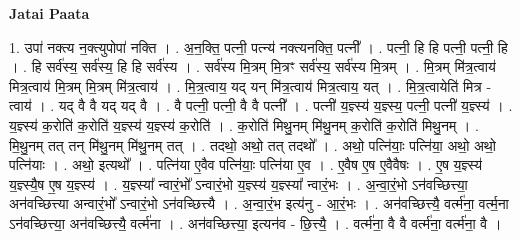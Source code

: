 \documentclass[17pt]{extarticle}
\begin{document}
\textbf{Jatai Paata} \newline

1. उपा॑ नक्त्य न॒क्त्युपोपा॑ नक्ति । . अ॒न॒क्ति॒ पत्नी॒ पत्न्य॑ नक्त्यनक्ति॒ पत्नी᳚ । . पत्नी॒ हि हि पत्नी॒ पत्नी॒ हि । . हि सर्व॑स्य॒ सर्व॑स्य॒ हि हि सर्व॑स्य । . सर्व॑स्य मि॒त्रम् मि॒त्रꣳ सर्व॑स्य॒ सर्व॑स्य मि॒त्रम् । . मि॒त्रम् मि॑त्र॒त्वाय॑ मित्र॒त्वाय॑ मि॒त्रम् मि॒त्रम् मि॑त्र॒त्वाय॑ । . मि॒त्र॒त्वाय॒ यद् यन् मि॑त्र॒त्वाय॑ मित्र॒त्वाय॒ यत् । . मि॒त्र॒त्वायेति॑ मित्र - त्वाय॑ । . यद् वै वै यद् यद् वै । . वै पत्नी॒ पत्नी॒ वै वै पत्नी᳚ । . पत्नी॑ य॒ज्ञ्स्य॑ य॒ज्ञ्स्य॒ पत्नी॒ पत्नी॑ य॒ज्ञ्स्य॑ । . य॒ज्ञ्स्य॑ क॒रोति॑ क॒रोति॑ य॒ज्ञ्स्य॑ य॒ज्ञ्स्य॑ क॒रोति॑ । . क॒रोति॑ मिथु॒नम् मि॑थु॒नम् क॒रोति॑ क॒रोति॑ मिथु॒नम् । . मि॒थु॒नम् तत् तन् मि॑थु॒नम् मि॑थु॒नम् तत् । . तदथो॒ अथो॒ तत् तदथो᳚ । . अथो॒ पत्नि॑याः॒ पत्नि॑या॒ अथो॒ अथो॒ पत्नि॑याः । . अथो॒ इत्यथो᳚ । . पत्नि॑या ए॒वैव पत्नि॑याः॒ पत्नि॑या ए॒व । . ए॒वैष ए॒ष ए॒वैवैषः । . ए॒ष य॒ज्ञ्स्य॑ य॒ज्ञ्स्यै॒ष ए॒ष य॒ज्ञ्स्य॑ । . य॒ज्ञ्स्या᳚ न्वारं॒भो᳚ ऽन्वारं॒भो य॒ज्ञ्स्य॑ य॒ज्ञ्स्या᳚ न्वारं॒भः । . अ॒न्वा॒रं॒भो ऽन॑वच्छित्त्या॒ अन॑वच्छित्त्या अन्वारं॒भो᳚ ऽन्वारं॒भो ऽन॑वच्छित्त्यै । . अ॒न्वा॒रं॒भ इत्य॑नु - आ॒रं॒भः । . अन॑वच्छित्त्यै॒ वर्त्म॑ना॒ वर्त्म॒ना ऽन॑वच्छित्त्या॒ अन॑वच्छित्त्यै॒ वर्त्म॑ना । . अन॑वच्छित्त्या॒ इत्यन॑व - छि॒त्त्यै॒ । . वर्त्म॑ना॒ वै वै वर्त्म॑ना॒ वर्त्म॑ना॒ वै । \newline
\end{document}
